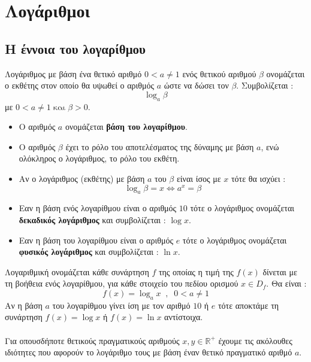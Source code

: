 \chapter{Λογάριθμοι}
\section{Η έννοια του λογαρίθμου}
\orismoi
{}
Λογάριθμος με βάση ένα θετικό αριθμό $ 0<a\neq1 $ ενός θετικού αριθμού $ \beta $ ονομάζεται ο εκθέτης στον οποίο θα υψωθεί ο αριθμός $ a $ ώστε να δώσει τον $ \beta $. Συμβολίζεται :
\[ \log_{a}{\beta} \]
με $ 0<a\neq1\;\textrm{και}\; \beta>0 $.
\begin{itemize}[itemsep=0mm]
\item Ο αριθμός $ a $ ονομάζεται \textbf{βάση του λογαρίθμου}.
\item Ο αριθμός $ \beta $ έχει το ρόλο του αποτελέσματος της δύναμης με βάση $ a $, ενώ ολόκληρος ο λογάριθμος, το ρόλο του εκθέτη.
\item Αν ο λογάριθμος (εκθέτης) με βάση $ a $ του $ \beta $ είναι ίσος με $ x $ τότε θα ισχύει :
\[ \log_{a}{\beta}=x\Leftrightarrow a^x=\beta \]
\item Εαν η βάση ενός λογαρίθμου είναι ο αριθμός $ 10 $ τότε ο λογάριθμος ονομάζεται \textbf{δεκαδικός λογάριθμος} και συμβολίζεται : $ \log{x} $.
\item Εαν η βάση του λογαρίθμου είναι ο αριθμός $ e $ τότε ο λογάριθμος ονομάζεται \textbf{φυσικός λογάριθμος} και συμβολίζεται : $ \ln{x} $.
\end{itemize}
Λογαριθμική ονομάζεται κάθε συνάρτηση $ f $ της οποίας η τιμή της $ f(x) $ δίνεται με τη βοήθεια ενός λογαρίθμου, για κάθε στοιχείο του πεδίου ορισμού $ x\in D_f $. Θα είναι :
\[ f(x)=\log_ax\;\;,\;\;0<a\neq1 \]
Αν η βάση $ a $ του λογαρίθμου γίνει ίση με τον αριθμό $ 10 $ ή $ e $ τότε αποκτάμε τη συνάρτηση $ f(x)=\log{x} $ ή $ f(x)=\ln{x} $ αντίστοιχα.\\\\
\thewrhmata
{}
Για οπουσδήποτε θετικούς πραγματικούς αριθμούς $ x,y\in\mathbb{R}^+ $ έχουμε τις ακόλουθες ιδιότητες που αφορούν το λογάριθμο τους με βάση έναν θετικό πραγματικό αριθμό $ a $.
